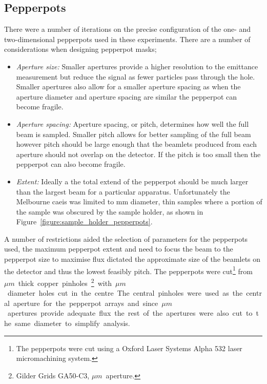 \subsection{Pepperpots}
There were a number of iterations on the precise configuration of the one- and two-dimensional pepperpots used in these experiments.
There are a number of considerations when designing pepperpot masks;
\begin{itemize}
    \item{\emph{Aperture size:} Smaller apertures provide a higher resolution to the emittance measurement but reduce the signal as fewer particles pass through the hole.
    Smaller apertures also allow for a smaller aperture spacing as when the aperture diameter and aperture spacing are similar the pepperpot can become fragile.}
    \item{\emph{Aperture spacing:} Aperture spacing, or pitch, determines how well the full beam is sampled.
    Smaller pitch allows for better sampling of the full beam however pitch should be large enough that the beamlets produced from each aperture should not overlap on the detector.
    If the pitch is too small then the pepperpot can also become fragile.}
    \item{\emph{Extent:} Ideally a the total extend of the pepperpot should be much larger than the largest beam for a particular apparatus.
    Unfortunately the Melbourne \gls{caeis} was limited to \unit[3]{mm} diameter, thin samples where a portion of the sample was obscured by the sample holder, as shown in Figure~\ref{figure:sample_holder_pepperpots}.}
\end{itemize}

A number of restrictions aided the selection of parameters for the pepperpots used, the maximum pepperpot extent and need to focus the beam to the pepperpot size to maximise flux dictated the approximate size of the beamlets on the detector and thus the lowest feasibly pitch.
The pepperpots were cut\footnote{The pepperpots were cut using a Oxford Laser Systems Alpha 532 laser micromachining system.} from \unit[25]{$\mu m$} thick copper pinholes\footnote{Gilder Grids GA50-C3, \unit[50]{$\mu m$} aperture.} with \unit[50]{$\mu m$} diameter holes cut in the centre.
The central pinholes were used as the central aperture for the pepperpot arrays and since \unit[50]{$\mu m$} apertures provide adequate flux the rest of the apertures were also cut to the same diameter to simplify analysis.

